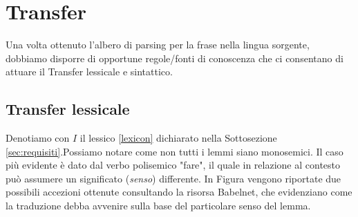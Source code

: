 \section{Transfer}
\label{sec:transfer}
Una volta ottenuto l'albero di parsing per la frase nella lingua sorgente,
dobbiamo disporre di opportune regole/fonti di conoscenza che ci consentano di attuare 
il Transfer lessicale e sintattico.
\subsection{Transfer lessicale}
Denotiamo con $I$ il lessico \ref{lexicon} dichiarato nella Sottosezione \ref{sec:requisiti}.Possiamo notare come non tutti i lemmi siano monosemici. Il caso più evidente è dato dal verbo polisemico "fare", il quale in relazione al contesto può assumere un significato (\textit{senso}) differente. In Figura vengono riportate due possibili accezioni ottenute consultando la risorsa Babelnet, che evidenziano come la traduzione debba avvenire sulla base del particolare senso del lemma. 
